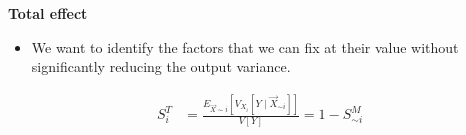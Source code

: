 \begin{frame}\textbf{Total effect}\vspace{0.3cm}

\begin{itemize}
\item We want to identify the factors that we can fix at their value without significantly reducing the output variance.
\end{itemize}

\begin{align*}
S^T_i & = \frac{E_{\vec{X} \sim i}[V_{X_i}[Y \mid \vec{X}_{\sim i}]]}{V[Y]} = 1 - S^M_{\sim i}
\end{align*}

\end{frame}
